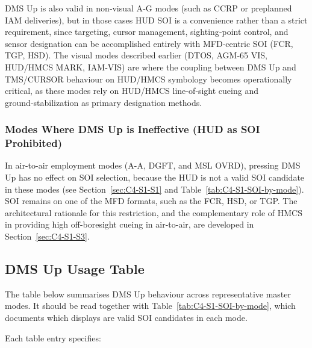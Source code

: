 \documentclass[11pt, a4paper, twoside]{report}
\begin{document}
DMS Up is also valid in non‑visual A‑G modes (such as CCRP or preplanned IAM deliveries), but in those cases HUD SOI is a convenience rather than a strict requirement, since targeting, cursor management, sighting‑point control, and sensor designation can be accomplished entirely with MFD‑centric SOI (FCR, TGP, HSD). The visual modes described earlier (DTOS, AGM‑65 VIS, HUD/HMCS MARK, IAM‑VIS) are where the coupling between DMS Up and TMS/CURSOR behaviour on HUD/HMCS symbology becomes operationally critical, as these modes rely on HUD/HMCS line‑of‑sight cueing and ground‑stabilization as primary designation methods.

\subsubsection{Modes Where DMS Up is Ineffective (HUD as SOI Prohibited)}
\label{sec:C4-S2-S1-S2}

In air-to-air employment modes (A-A, DGFT, and MSL OVRD), pressing DMS Up has no effect on SOI selection, because the HUD is not a valid SOI candidate in these modes (see Section~\ref{sec:C4-S1-S1} and Table~\ref{tab:C4-S1-SOI-by-mode}). SOI remains on one of the MFD formats, such as the FCR, HSD, or TGP. The architectural rationale for this restriction, and the complementary role of HMCS in providing high off-boresight cueing in air-to-air, are developed in Section~\ref{sec:C4-S1-S3}.

\subsection{DMS Up Usage Table}
\label{sec:C4-S2-S2}

The table below summarises DMS Up behaviour across representative master modes. It should be read together with Table~\ref{tab:C4-S1-SOI-by-mode}, which documents which displays are valid SOI candidates in each mode.

Each table entry specifies:
\end{document}
